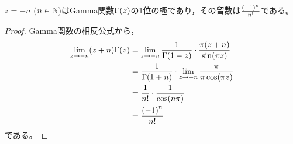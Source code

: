 \documentclass[a4paper,draft]{ltjsarticle}
\begin{document}
\begin{prop}[Gamma関数の極と留数]
    $z=-n$ ($n\in\mathbb{N}$)はGamma関数$\fun{\Gamma}{z}$の1位の極であり，その留数は$\frac{\pare{-1}^n}{n!}$である。
    \begin{proof}
        Gamma関数の相反公式から，
        \begin{align}
            \lim_{z\to -n}\pare{z+n}\fun{\Gamma}{z}
            &=\lim_{z\to -n}\frac{1}{\fun{\Gamma}{1-z}}\cdot\frac{\pi\pare{z+n}}{\fun{\sin}{\pi z}}
            \\
            &=\frac{1}{\fun{\Gamma}{1+n}}\cdot \lim_{z\to -n} \frac{\pi}{\pi\fun{\cos}{\pi z}}
            \\
            &=\frac{1}{n!}\cdot \frac{1}{\fun{\cos}{n \pi}}
            \\
            &=\frac{\pare{-1}^n}{n!}
        \end{align}
        である。
    \end{proof}
\end{prop}
\end{document}
